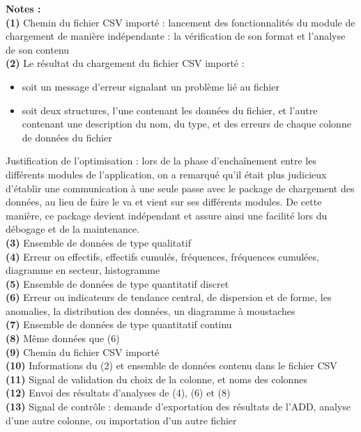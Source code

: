 		\textbf{Notes :}\\
			\textbf{({\color{red}1})} Chemin du fichier CSV importé : lancement des fonctionnalités du module de chargement de manière indépendante : la vérification de son format et l'analyse de son contenu\\
			\textbf{({\color{red}2})} Le résultat du chargement du fichier CSV importé :
			\begin{itemize}
				\item soit un message d'erreur signalant un problème lié au fichier
				\item soit deux structures, l'une contenant les données du fichier, et l'autre contenant une description du nom, du type, et des erreurs de chaque colonne de données du fichier
			\end{itemize}
			{\color{red}Justification de l'optimisation :} lors de la phase d'enchaînement entre les différents modules de l'application, on a remarqué qu'il était plus judicieux d'établir une communication à une seule passe avec le package de chargement des données, au lieu de faire le va et vient sur ses différents modules. De cette manière, ce package devient indépendant et assure ainsi une facilité lors du débogage et de la maintenance.\\
			\textbf{(3)} Ensemble de données de type qualitatif\\
			\textbf{(4)} Erreur ou effectifs, effectifs cumulés, fréquences, fréquences cumulées, diagramme en secteur, histogramme\\
			\textbf{(5)} Ensemble de données de type quantitatif discret\\
			\textbf{(6)} Erreur ou indicateurs de tendance central, de dispersion et de forme, les anomalies, la distribution des données, un diagramme à moustaches\\
			\textbf{(7)} Ensemble de données de type quantitatif continu\\
			\textbf{(8)} Même données que (6)\\
			\textbf{(9)} Chemin du fichier CSV importé \\
			\textbf{(10)} Informations du (2) et ensemble de données contenu dans le fichier CSV \\
			\textbf{(11)} Signal de validation du choix de la colonne, et noms des colonnes\\
			\textbf{(12)} Envoi des résultats d'analyses de (4), (6) et (8)\\
			\textbf{(13)} Signal de contrôle : demande d'exportation des résultats de l'ADD, analyse d'une autre colonne, ou importation d'un autre fichier\\
		
